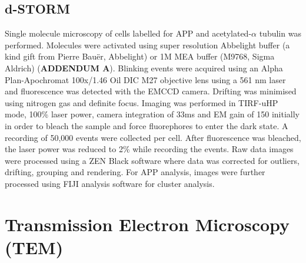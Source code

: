 \subsection{d-STORM}
Single molecule microscopy of cells labelled for APP and acetylated-$\alpha$ tubulin was performed. Molecules were activated using super resolution Abbelight buffer (a kind gift from Pierre Bauër, Abbelight) or 1M MEA buffer (M9768, Sigma Aldrich) (\textbf{ADDENDUM A}). Blinking events were acquired using an Alpha Plan-Apochromat 100x/1.46 Oil DIC M27 objective lens using a 561 nm laser and fluorescence was detected with the EMCCD camera. Drifting was minimised using nitrogen gas and definite focus. Imaging was performed in TIRF-uHP mode, 100\% laser power, camera integration of 33ms and EM gain of 150 initially in order to bleach the sample and force fluorephores to enter the dark state. A recording of 50,000 events were collected per cell. After fluorescence was bleached, the laser power was reduced to 2\% while recording the events. Raw data images were processed using a ZEN Black software where data was corrected for outliers, drifting, grouping and rendering. For APP analysis, images were further processed using FIJI analysis software for cluster analysis. 

\section{Transmission Electron Microscopy (TEM)}





 

